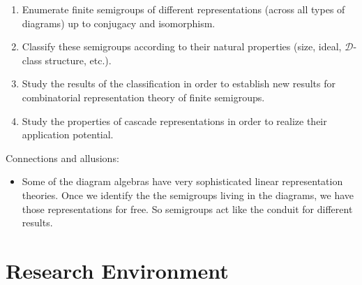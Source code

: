 \documentclass{amsart}
\newcommand{\cD}{\mathcal D}
\begin{document}
\begin{enumerate}
\item Enumerate finite semigroups of different representations (across all types of diagrams) up to conjugacy and isomorphism.
\item Classify these semigroups according to their natural properties (size, ideal, $\cD$-class structure, etc.).
\item Study the results of the classification in order to establish new results for combinatorial representation theory of finite semigroups.
\item Study the properties of cascade representations in order to realize their application potential.
\end{enumerate}


Connections and allusions:
\begin{itemize}
\item Some of the diagram algebras have very sophisticated linear representation theories. Once we identify the the semigroups living in the diagrams, we have those representations for free. So semigroups act like the conduit for different results.
\end{itemize}


\section{Research Environment}






\end{document}
